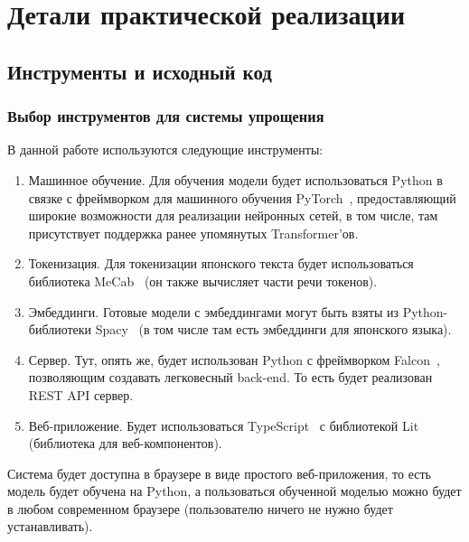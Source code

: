 

\chapter{Детали практической реализации}


\section{Инструменты и исходный код}


\subsection{Выбор инструментов для системы упрощения}


В данной работе используются следующие инструменты:
\begin{enumerate}[1.]%
  \item Машинное обучение. Для обучения модели будет использоваться Python в связке с фреймворком для машинного обучения PyTorch~\cite{PyTorch}, предоставляющий широкие возможности для реализации нейронных сетей, в том числе, там присутствует поддержка ранее упомянутых Transformer'ов.
  \item Токенизация. Для токенизации японского текста будет использоваться библиотека MeCab~\cite{MeCab} (он также вычисляет части речи токенов).
  \item Эмбеддинги. Готовые модели с эмбеддингами могут быть взяты из Python-библиотеки Spacy~\cite{Spacy} (в том числе там есть эмбеддинги для японского языка).
  \item Сервер. Тут, опять же, будет использован Python с фреймворком Falcon~\cite{Falcon}, позволяющим создавать легковесный back-end. То есть будет реализован REST API сервер.
  \item Веб-приложение. Будет использоваться TypeScript~\cite{TypeScript} с библиотекой Lit~\cite{Lit} (библиотека для веб-компонентов).
\end{enumerate}

Система будет доступна в браузере в виде простого веб-приложения, то есть модель будет обучена на Python, а пользоваться обученной моделью можно будет в любом современном браузере (пользователю ничего не нужно будет устанавливать).


